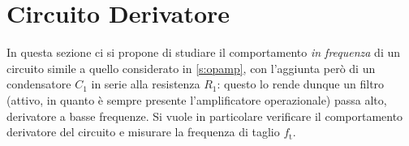 \documentclass[a4paper,11pt]{article} %
\begin{document}

\section{Circuito Derivatore}
In questa sezione ci si propone di studiare il comportamento \textit{in frequenza} di un circuito simile a quello
considerato in \autoref{s:opamp}, con l'aggiunta però di un condensatore $C_{1}$ in serie alla resistenza $R_{1}$:
questo lo rende dunque un filtro (attivo, in quanto è sempre presente l'amplificatore operazionale) passa alto,
derivatore a basse frequenze. Si vuole in particolare verificare il comportamento derivatore del circuito e misurare la
frequenza di taglio $f_{\text{t}}$.


\end{document}
